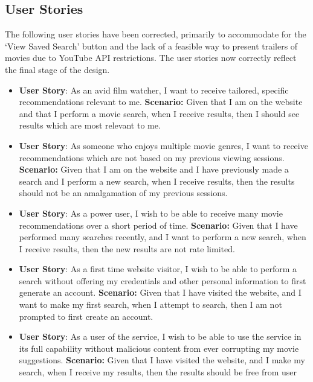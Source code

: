 \documentclass{article}
\begin{document}
\subsection{User Stories}
The following user stories have been corrected, primarily to accommodate for the
`View Saved Search' button and the lack of a feasible way to present
trailers of movies due to YouTube API restrictions. The user stories now
correctly reflect the final stage of the design.
\begin{itemize}
\item \textbf{User Story}: As an avid film watcher, I want to receive
tailored, specific recommendations relevant to me.
\newline \textbf {Scenario:} Given that I am on the website and that I perform
a movie search, when I receive results, then I should see results which are
most relevant to me.
\item \textbf{User Story}: As someone who enjoys multiple movie genres, I want
to receive recommendations which are not based on my previous viewing sessions.
\newline \textbf {Scenario:} Given that I am on the website and I have
previously made a search and I perform a new search, when I receive results,
then the results should not be an amalgamation of my previous sessions.
\item \textbf{User Story}: As a power user, I wish to be able to receive many
movie recommendations over a short period of time.
\newline \textbf {Scenario:} Given that I have performed many searches recently,
and I want to perform a new search, when I receive results, then the new
results are not rate limited.
\item \textbf{User Story}: As a first time website visitor, I wish to be able
to perform a search without offering my credentials and other personal
information to first generate an account.
\newline \textbf {Scenario:} Given that I have visited the website, and I want
to make my first search, when I attempt to search, then I am not prompted
to first create an account.
\item \textbf{User Story}: As a user of the service, I wish to be able to use
the service in its full capability without malicious content from ever
corrupting my movie suggestions.
\newline \textbf {Scenario:}  Given that I have visited the website, and I make
my search, when I receive my results, then the results should be free from user

\end{itemize}
\end{document}
